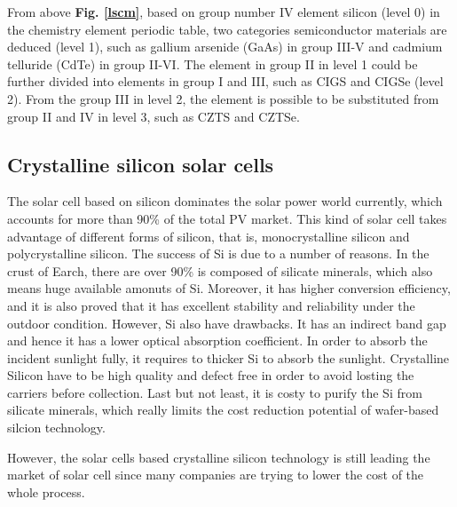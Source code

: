 \documentclass[a4paper, 12pt, titlepage,oneside,drop]{kthesis}
\begin{document}
From above \textbf{Fig. \ref{lscm}}, based on group number IV element silicon (level 0) in the chemistry element periodic table, two categories semiconductor materials are deduced (level 1), such as gallium arsenide (GaAs) in group III-V and cadmium telluride (CdTe)
in group II-VI. The element in group II in level 1 could be further divided into elements in group I and III, such as CIGS and CIGSe (level 2). From the group III in level 2, the element is possible to
be substituted from group II and IV in level 3, such as CZTS and CZTSe.


\subsection{Crystalline silicon solar cells}
The solar cell based on silicon dominates the solar power world currently, which accounts for more than 90\% of the total PV market.
This kind of solar cell takes advantage of different forms of silicon, that is, monocrystalline silicon and polycrystalline silicon. 
The success of Si is due to a number of reasons. In the crust of Earch, there are over 90\% is composed of silicate minerals, which also means huge available amonuts of Si. Moreover, it has higher conversion efficiency, and it is also proved that 
it has excellent stability and reliability under the outdoor condition. However, Si also have drawbacks. It has an indirect band gap and hence it has a lower optical absorption coefficient. In order to absorb the incident sunlight fully, 
it requires to thicker Si to absorb the sunlight. Crystalline Silicon have to be high quality and defect free in order to avoid losting the carriers before collection. Last but not least, it is costy to purify the Si from silicate minerals, which
really limits the cost reduction potential of wafer-based silcion technology. 

However, the solar cells based crystalline silicon technology is still leading the market of solar cell since many companies are trying to lower the cost of the whole process.
\end{document}
